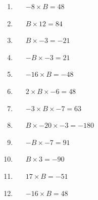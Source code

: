 \documentclass[a4paper,12pt]{article}
\begin{document}
\begin{tcolorbox}[colback=red!0!white, colframe=gray ,title=\subsubsection{In these sums the letter ``B'' stands for a number. Find the correct value of B in each of the sums.}\label{multInt4}]
	\begin{multicols}{3}
		\begin{enumerate}[label=\footnotesize \roman*)]
			\item~~~$-8\times B=48$
			\item~~~$B\times12=84$
			\item~~~$B\times-3=-21$
			\item~~~$-B\times-3=21$
			\item~~~$-16\times B=-48$
			\item~~~$2\times B \times-6=48$
			\item~~~$-3\times B \times -7=63$
			\item~~~$B \times-20 \times -3=-180$
			\item~~~$-B\times -7=91$
			\item~~~$B\times3=-90$
			\item~~~$17\times B= -51$
			\item~~~$-16\times B=48$
		\end{enumerate}
	\end{multicols}
\end{tcolorbox}\vspace{0.75cm}
\end{document}
